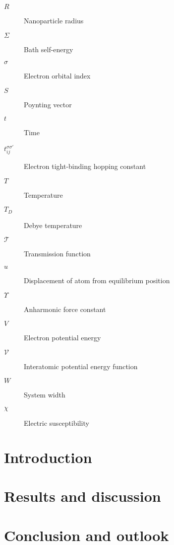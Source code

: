 \documentclass[dissertation,draft*]{aaltoseries}
\newcommand{\bb}{\mathbf}
\newcommand{\bu}{\bb{u}}
\begin{document}
\begin{description}
  \item[$R$] Nanoparticle radius
   \item[$\Sigma$] Bath self-energy
  \item[$\sigma$] Electron orbital index
  \item[$S$] Poynting vector
  \item[$t$] Time
  \item[$t_{ij}^{\sigma\sigma'}$] Electron tight-binding hopping constant
  \item[$T$] Temperature
  \item[$T_D$] Debye temperature
  \item[$\mathcal{T}$] Transmission function
  \item[$u$] Displacement of atom from equilibrium position
  \item[$\Upsilon$] Anharmonic force constant
  \item[${V}$] Electron potential energy
  \item[$\mathcal{V}$] Interatomic potential energy function
  \item[$W$] System width
  \item[$\chi$] Electric susceptibility
\end{description}

\chapter{Introduction}
\setcounter{page}{1}




\chapter{Results and discussion}




\chapter{Conclusion and outlook}



\renewcommand{\bibname}{References}

%
{}

%
%
\end{document}
